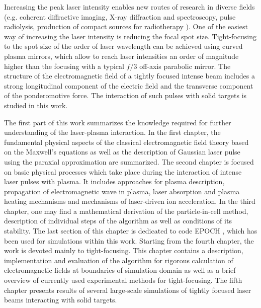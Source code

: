 Increasing the peak laser intensity enables new routes of research in diverse fields (e.g. coherent diffractive imaging, X-ray diffraction and spectroscopy, pulse radiolysis, production of compact sources for radiotherapy \cite{Zewail2010, Bulanov2004, Malka2004}). One of the easiest way of increasing the laser intensity is reducing the focal spot size. Tight-focusing to the spot size of the order of laser wavelength can be achieved using curved plasma mirrors, which allow to reach laser intensities an order of magnitude higher than the focusing with a typical $ f/3 $ off-axis parabolic mirror. The structure of the electromagnetic field of a tightly focused intense beam includes a strong longitudinal component of the electric field and the transverse component of the ponderomotive force. The interaction of such pulses with solid targets is studied in this work.

The first part of this work summarizes the knowledge required for further understanding of the laser-plasma interaction. In the first chapter, the fundamental physical aspects of the classical electromagnetic field theory \cite{Stratton2007, Jackson2005, Feynman1963, Thide2011} based on the Maxwell's equations as well as the description of Gaussian laser pulse using the paraxial approximation \cite{Born2013} are summarized. The second chapter is focused on basic physical processes which take place during the interaction of intense laser pulses with plasma. It includes approaches for plasma description, propagation of electromagnetic wave in plasma, laser absorption and plasma heating mechanisms and mechanisms of laser-driven ion acceleration. In the third chapter, one may find a mathematical derivation of the particle-in-cell method, description of individual steps of the algorithm as well as conditions of its stability. The last section of this chapter is dedicated to code EPOCH \cite{bennett}, which has been used for simulations within this work. Starting from the fourth chapter, the work is devoted mainly to tight-focusing. This chapter contains a description, implementation and evaluation of the algorithm for rigorous calculation of electromagnetic fields at boundaries of simulation domain \cite{Thiele2016} as well as a brief overview of currently used experimental methods for tight-focusing. The fifth chapter presents results of several large-scale simulations of tightly focused laser beams interacting with solid targets.

